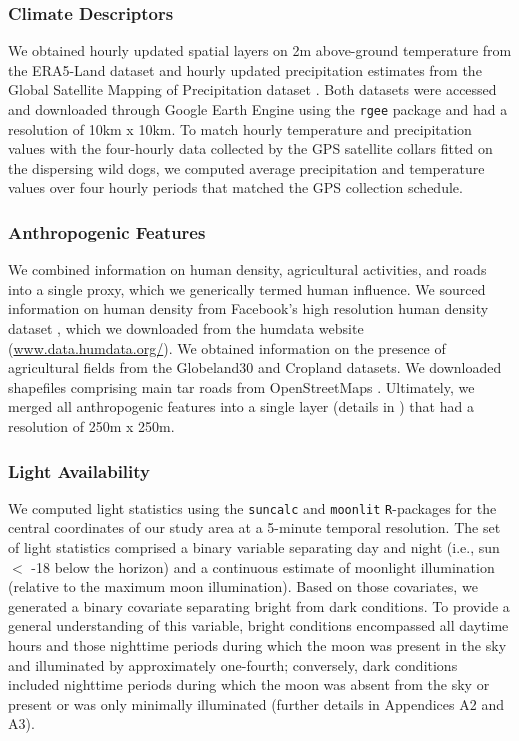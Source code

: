 \documentclass[abstract=on,10pt,a4paper,bibliography=totocnumbered]{article}
\begin{document}
\subsubsection{Climate Descriptors}

We obtained hourly updated spatial layers on 2m above-ground temperature from
the ERA5-Land dataset \citep{Munoz-Sabater.2021} and hourly updated
precipitation estimates from the Global Satellite Mapping of Precipitation
dataset \citep{Kubota.2020}. Both datasets were accessed and downloaded through
Google Earth Engine \citep{Gorelick.2017} using the \texttt{rgee} package
\citep{Aybar.2024} and had a resolution of 10km x 10km. To match hourly
temperature and precipitation values with the four-hourly data collected by the
GPS satellite collars fitted on the dispersing wild dogs, we computed average
precipitation and temperature values over four hourly periods that matched the
GPS collection schedule.

\subsubsection{Anthropogenic Features}

We combined information on human density, agricultural activities, and roads
into a single proxy, which we generically termed human influence. We sourced
information on human density from Facebook's high resolution human density
dataset \citep{Tiecke.2017}, which we downloaded from the humdata website
(\url{www.data.humdata.org/}). We obtained information on the presence of
agricultural fields from the Globeland30 \citep{Chen.2015} and Cropland
\citep{Xiong.2017} datasets. We  downloaded shapefiles comprising main tar roads
from OpenStreetMaps \citep{OpenStreetMapContributors.2017}. Ultimately, we
merged all anthropogenic features into a single layer (details in
\citealp{Hofmann.2021}) that had a resolution of 250m x 250m.

\subsubsection{Light Availability}

We computed light statistics using the \texttt{suncalc} and \texttt{moonlit}
\texttt{R}-packages \citep{Thieurmel.2022, Smielak.2023} for the central
coordinates of our study area at a 5-minute temporal resolution. The set of
light statistics comprised a binary variable separating day and night (i.e., sun
$<$ -18 \degree below the horizon) and a continuous estimate of moonlight
illumination (relative to the maximum moon illumination). Based on those
covariates, we generated a binary covariate separating bright from dark
conditions. To provide a general understanding of this variable, bright
conditions encompassed all daytime hours and those nighttime periods during
which the moon was present in the sky and illuminated by approximately
one-fourth; conversely, dark conditions included nighttime periods during which
the moon was absent from the sky or present or was only minimally illuminated
(further details in Appendices A2 and A3).
\end{document}
